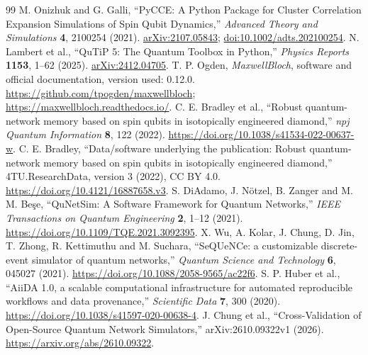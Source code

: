 \documentclass[11pt,a4paper]{article}
\begin{document}
{\begin{thebibliography}{99}
 M. Onizhuk and G. Galli, ``PyCCE: A Python Package for Cluster Correlation Expansion Simulations of Spin Qubit Dynamics,'' \emph{Advanced Theory and Simulations} \textbf{4}, 2100254 (2021). \href{https://arxiv.org/abs/2107.05843}{arXiv:2107.05843}; \href{https://doi.org/10.1002/adts.202100254}{doi:10.1002/adts.202100254}.
 N. Lambert et al., ``QuTiP 5: The Quantum Toolbox in Python,'' \emph{Physics Reports} \textbf{1153}, 1--62 (2025). \href{https://arxiv.org/abs/2412.04705}{arXiv:2412.04705}.
 T. P. Ogden, \emph{MaxwellBloch}, software and official documentation, version used: 0.12.0. \url{https://github.com/tpogden/maxwellbloch}; \url{https://maxwellbloch.readthedocs.io/}.
 C. E. Bradley et al., ``Robust quantum-network memory based on spin qubits in isotopically engineered diamond,'' \emph{npj Quantum Information} \textbf{8}, 122 (2022). \url{https://doi.org/10.1038/s41534-022-00637-w}.
 C. E. Bradley, ``Data/software underlying the publication: Robust quantum-network memory based on spin qubits in isotopically engineered diamond,'' 4TU.ResearchData, version 3 (2022), CC BY 4.0. \url{https://doi.org/10.4121/16887658.v3}.
 S. DiAdamo, J. N\"otzel, B. Zanger and M. M. Be\c{s}e, ``QuNetSim: A Software Framework for Quantum Networks,'' \emph{IEEE Transactions on Quantum Engineering} \textbf{2}, 1--12 (2021). \url{https://doi.org/10.1109/TQE.2021.3092395}.
 X. Wu, A. Kolar, J. Chung, D. Jin, T. Zhong, R. Kettimuthu and M. Suchara, ``SeQUeNCe: a customizable discrete-event simulator of quantum networks,'' \emph{Quantum Science and Technology} \textbf{6}, 045027 (2021). \url{https://doi.org/10.1088/2058-9565/ac22f6}.
 S. P. Huber et al., ``AiiDA 1.0, a scalable computational infrastructure for automated reproducible workflows and data provenance,'' \emph{Scientific Data} \textbf{7}, 300 (2020). \url{https://doi.org/10.1038/s41597-020-00638-4}.
 J. Chung et al., ``Cross-Validation of Open-Source Quantum Network Simulators,'' arXiv:2610.09322v1 (2026). \url{https://arxiv.org/abs/2610.09322}.
\end{thebibliography}
}
\end{document}
